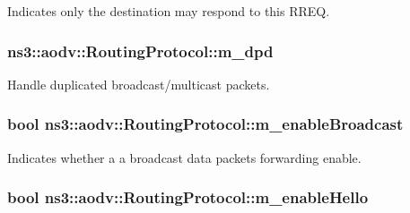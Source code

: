 Indicates only the destination may respond to this R\+R\+EQ. 

\subsubsection[{\texorpdfstring{m\+\_\+dpd}{m_dpd}}]{ ns3\+::aodv\+::\+Routing\+Protocol\+::m\+\_\+dpd\hspace{0.3cm}{\ttfamily [private]}}\hypertarget{classns3_1_1aodv_1_1RoutingProtocol_a43361f0a08b0c538415910cd904d0af9}{}\label{classns3_1_1aodv_1_1RoutingProtocol_a43361f0a08b0c538415910cd904d0af9}


Handle duplicated broadcast/multicast packets. 

\subsubsection[{\texorpdfstring{m\+\_\+enable\+Broadcast}{m_enableBroadcast}}]{\setlength{\rightskip}{0pt plus 5cm}bool ns3\+::aodv\+::\+Routing\+Protocol\+::m\+\_\+enable\+Broadcast\hspace{0.3cm}{\ttfamily [private]}}\hypertarget{classns3_1_1aodv_1_1RoutingProtocol_a15b6c0f3a19ecf251f4492a71e95d080}{}\label{classns3_1_1aodv_1_1RoutingProtocol_a15b6c0f3a19ecf251f4492a71e95d080}


Indicates whether a a broadcast data packets forwarding enable. 

\subsubsection[{\texorpdfstring{m\+\_\+enable\+Hello}{m_enableHello}}]{\setlength{\rightskip}{0pt plus 5cm}bool ns3\+::aodv\+::\+Routing\+Protocol\+::m\+\_\+enable\+Hello\hspace{0.3cm}{\ttfamily [private]}}\hypertarget{classns3_1_1aodv_1_1RoutingProtocol_ac1cb4715e9ac42540c051268db368ae8}{}\label{classns3_1_1aodv_1_1RoutingProtocol_ac1cb4715e9ac42540c051268db368ae8}


